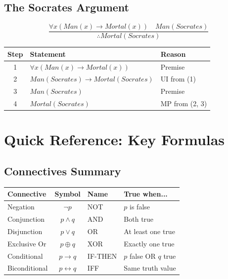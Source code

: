 \documentclass[11pt,a4paper]{article}
\begin{document}
\subsection{The Socrates Argument}

$$\frac{\forall x(Man(x) \to Mortal(x)) \quad Man(Socrates)}{\therefore Mortal(Socrates)}$$

\begin{center}
\begin{tabular}{c|l|l}
\toprule
\textbf{Step} & \textbf{Statement} & \textbf{Reason} \\
\midrule
1 & $\forall x(Man(x) \to Mortal(x))$ & Premise \\
2 & $Man(Socrates) \to Mortal(Socrates)$ & UI from (1) \\
3 & $Man(Socrates)$ & Premise \\
4 & $Mortal(Socrates)$ & MP from (2, 3) \\
\bottomrule
\end{tabular}
\end{center}

\newpage


\section*{Quick Reference: Key Formulas}

\subsection*{Connectives Summary}

\begin{center}
\begin{tabular}{l|c|l|l}
\toprule
\textbf{Connective} & \textbf{Symbol} & \textbf{Name} & \textbf{True when...} \\
\midrule
Negation & $\neg p$ & NOT & $p$ is false \\
Conjunction & $p \land q$ & AND & Both true \\
Disjunction & $p \lor q$ & OR & At least one true \\
Exclusive Or & $p \oplus q$ & XOR & Exactly one true \\
Conditional & $p \to q$ & IF-THEN & $p$ false OR $q$ true \\
Biconditional & $p \leftrightarrow q$ & IFF & Same truth value \\
\bottomrule
\end{tabular}
\end{center}
\end{document}
